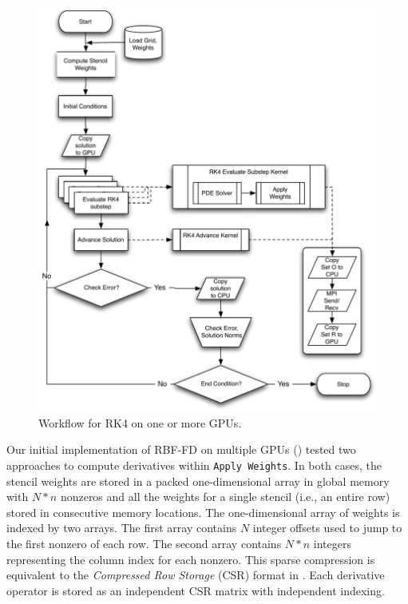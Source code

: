 \documentclass{report}
\begin{document}
\begin{figure}[ht]
      \centering
       \includegraphics[width=5in]{../figures/paper1/figures/omnigraffle/RK4_multi_GPU_flow.pdf}
      \caption{Workflow for RK4 on one or more GPUs. }
      \label{fig:multi_GPU_flow}
\end{figure}
 
Our initial implementation of RBF-FD on multiple GPUs (\cite{BolligFlyerErlebacher2012}) tested two approaches to compute derivatives within \texttt{Apply Weights}. 
In both cases, the stencil weights are stored in  
a packed one-dimensional array in global memory with $N*n$ nonzeros and all the weights 
for a single stencil (i.e., an entire row) stored in consecutive memory locations. The one-dimensional array of weights is indexed by two arrays. The first array contains $N$ integer offsets used to jump to the first nonzero of each row. The second array contains $N*n$ integers representing the column index for each nonzero. This sparse compression is equivalent to the \emph{Compressed Row Storage} (CSR) format in \cite{Bell2009, Rupp2010, Cusp2012}. Each derivative operator is stored as an independent CSR matrix with independent indexing. 
\end{document}
